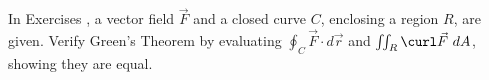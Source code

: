 {\noindent In Exercises}
{, a vector field $\vec F$ and a closed curve $C$, enclosing a region $R$, are given. Verify Green's Theorem by evaluating $\oint_C\vec F\cdot d\vec r$ and $\iint_R \curl \vec F\ dA$, showing they are equal. 
}
